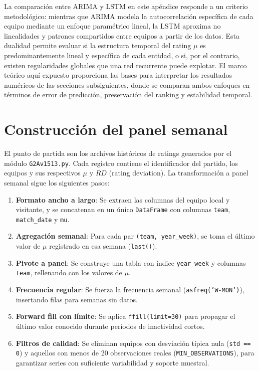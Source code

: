 La comparaci\'on entre ARIMA y LSTM en este ap\'endice responde a un criterio metodol\'ogico: mientras que ARIMA modela la autocorrelaci\'on espec\'ifica de cada equipo mediante un enfoque param\'etrico lineal, la LSTM aproxima no linealidades y patrones compartidos entre equipos a partir de los datos. Esta dualidad permite evaluar si la estructura temporal del rating $\mu$ es predominantemente lineal y espec\'ifica de cada entidad, o si, por el contrario, existen regularidades globales que una red recurrente puede explotar. El marco te\'orico aqu\'i expuesto proporciona las bases para interpretar los resultados num\'ericos de las secciones subsiguientes, donde se comparan ambos enfoques en t\'erminos de error de predicci\'on, preservaci\'on del ranking y estabilidad temporal.

\section{Construcci\'on del panel semanal}
\label{ap:panel_semanal}

El punto de partida son los archivos hist\'oricos de ratings generados por el m\'odulo \texttt{G2Av1513.py}. Cada registro contiene el identificador del partido, los equipos y sus respectivos \(\mu\) y \(RD\) (rating deviation). La transformaci\'on a panel semanal sigue los siguientes pasos:

\begin{enumerate}
	\item \textbf{Formato ancho a largo}: Se extraen las columnas del equipo local y visitante, y se concatenan en un \'unico \texttt{DataFrame} con columnas \texttt{team}, \texttt{match\_date} y \texttt{mu}.
	\item \textbf{Agregaci\'on semanal}: Para cada par \texttt{(team, year\_week)}, se toma el \'ultimo valor de \(\mu\) registrado en esa semana (\texttt{last()}).
	\item \textbf{Pivote a panel}: Se construye una tabla con \'indice \texttt{year\_week} y columnas \texttt{team}, rellenando con los valores de \(\mu\).
	\item \textbf{Frecuencia regular}: Se fuerza la frecuencia semanal (\texttt{asfreq('W-MON')}), insertando filas para semanas sin datos.
	\item \textbf{Forward fill con l\'imite}: Se aplica \texttt{ffill(limit=30)} para propagar el \'ultimo valor conocido durante per\'iodos de inactividad cortos.
	\item \textbf{Filtros de calidad}: Se eliminan equipos con desviaci\'on t\'ipica nula (\texttt{std == 0}) y aquellos con menos de 20 observaciones reales (\texttt{MIN\_OBSERVATIONS}), para garantizar series con suficiente variabilidad y soporte muestral.
\end{enumerate}

